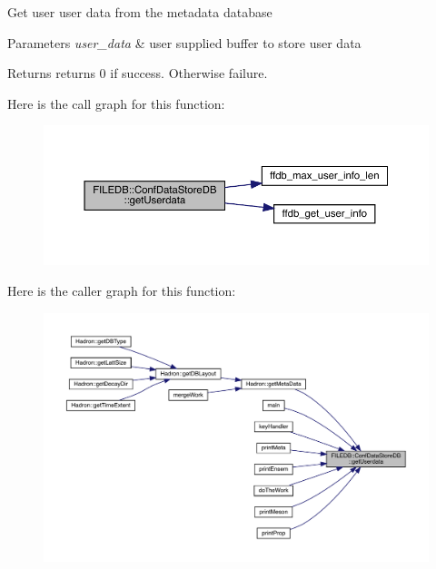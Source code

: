 Get user user data from the metadata database


\begin{DoxyParams}{Parameters}
{\em user\+\_\+data} & user supplied buffer to store user data \\
\hline
\end{DoxyParams}
\begin{DoxyReturn}{Returns}
returns 0 if success. Otherwise failure. 
\end{DoxyReturn}
Here is the call graph for this function\+:
\nopagebreak
\begin{figure}[H]
\begin{center}
\leavevmode
\includegraphics[width=350pt]{d8/d19/classFILEDB_1_1ConfDataStoreDB_abf7ce0847e1d68f960836826d68c0079_cgraph}
\end{center}
\end{figure}
Here is the caller graph for this function\+:
\nopagebreak
\begin{figure}[H]
\begin{center}
\leavevmode
\includegraphics[width=350pt]{d8/d19/classFILEDB_1_1ConfDataStoreDB_abf7ce0847e1d68f960836826d68c0079_icgraph}
\end{center}
\end{figure}
\mbox{\label{classFILEDB_1_1ConfDataStoreDB_abf7ce0847e1d68f960836826d68c0079}} 
